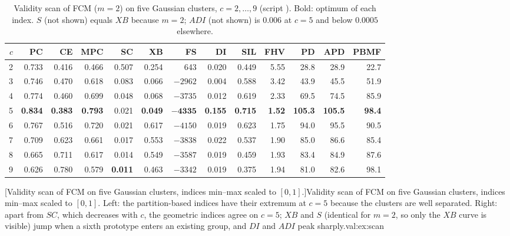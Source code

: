 \begin{table}[htbp]\centering\footnotesize\setlength{\tabcolsep}{2.4pt}
\caption[Validity scan of FCM ($m=2$) on five Gaussian clusters, $c=2,\dots,9$ (script ).]{Validity scan of FCM ($m=2$) on five Gaussian clusters, $c=2,\dots,9$ (script ). Bold: optimum of each index. $S$ (not shown) equals $XB$ because $m=2$; $ADI$ (not shown) is $0.006$ at $c=5$ and below $0.0005$ elsewhere.}
\label{tab:val:scan}
\begin{tabular}{@{}r rrr rr r rr rrr r@{}}\toprule
$c$ & PC & CE & MPC & SC & XB & FS & DI & SIL & FHV & PD & APD & PBMF \\\midrule
2 & 0.733 & 0.416 & 0.466 & 0.507 & 0.254 & 643 & 0.020 & 0.449 & 5.55 & 28.8 & 28.9 & 22.7 \\
3 & 0.746 & 0.470 & 0.618 & 0.083 & 0.066 & $-2962$ & 0.004 & 0.588 & 3.42 & 43.9 & 45.5 & 51.9 \\
4 & 0.774 & 0.460 & 0.699 & 0.048 & 0.068 & $-3735$ & 0.012 & 0.619 & 2.33 & 69.5 & 74.5 & 85.9 \\
5 & \textbf{0.834} & \textbf{0.383} & \textbf{0.793} & 0.021 & \textbf{0.049} & $\mathbf{-4335}$ & \textbf{0.155} & \textbf{0.715} & \textbf{1.52} & \textbf{105.3} & \textbf{105.5} & \textbf{98.4} \\
6 & 0.767 & 0.516 & 0.720 & 0.021 & 0.617 & $-4150$ & 0.019 & 0.623 & 1.75 & 94.0 & 95.5 & 90.5 \\
7 & 0.709 & 0.623 & 0.661 & 0.017 & 0.553 & $-3838$ & 0.022 & 0.537 & 1.90 & 85.0 & 86.6 & 85.4 \\
8 & 0.665 & 0.711 & 0.617 & 0.014 & 0.549 & $-3587$ & 0.019 & 0.459 & 1.93 & 83.4 & 84.9 & 87.6 \\
9 & 0.626 & 0.780 & 0.579 & \textbf{0.011} & 0.463 & $-3342$ & 0.019 & 0.375 & 1.94 & 81.0 & 82.6 & 98.1 \\\bottomrule
\end{tabular}
\end{table}

[{Validity scan of FCM on five Gaussian clusters, indices min--max scaled to $[0,1]$.}]{Validity scan of FCM on five Gaussian clusters, indices min--max scaled to $[0,1]$. Left: the partition-based indices have their extremum at $c=5$ because the clusters are well separated. Right: apart from $SC$, which decreases with $c$, the geometric indices agree on $c=5$; $XB$ and $S$ (identical for $m=2$, so only the $XB$ curve is visible) jump when a sixth prototype enters an existing group, and $DI$ and $ADI$ peak sharply.}{val:ex:scan}

